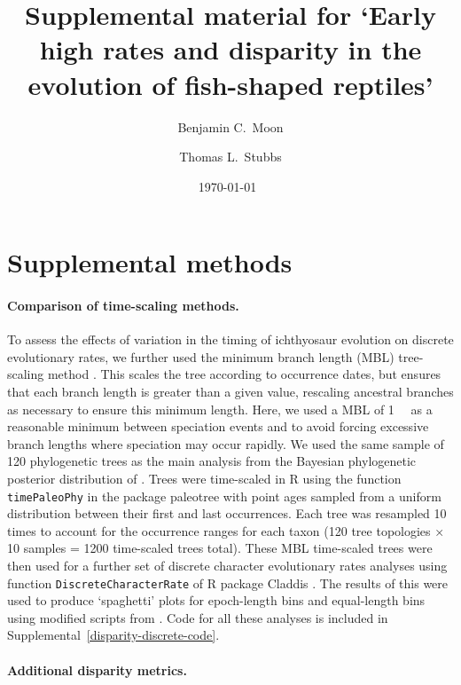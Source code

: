 \documentclass[british,a4paper]{article}
\title{Supplemental material for ‘Early high rates and disparity in the evolution of fish-shaped reptiles’}
\author{Benjamin C.\ Moon \and Thomas L.\ Stubbs}
\date{\today~\version}
\begin{document}
\maketitle

\tableofcontents

\section{Supplemental methods}\label{supplemental-methods}

\paragraph{Comparison of time-scaling methods.}
\label{comparison-of-time-scaling-methods}

To assess the effects of variation in the timing of ichthyosaur evolution on discrete evolutionary rates, we further used the minimum branch length (MBL) tree-scaling method \autocite{Bapst2012, Laurin2004SystBiol}. This scales the tree according to occurrence dates, but ensures that each branch length is greater than a given value, rescaling ancestral branches as necessary to ensure this minimum length. Here, we used a MBL of \SI{1}{\mega\annum} as a reasonable minimum between speciation events and to avoid forcing excessive branch lengths where speciation may occur rapidly. We used the same sample of 120 phylogenetic trees as the main analysis from the Bayesian phylogenetic posterior distribution of \textcite{Moon2019a}. Trees were time-scaled in R \autocite{R} using the function \texttt{timePaleoPhy} in the package paleotree \autocite{Bapst2012} with point ages sampled from a uniform distribution between their first and last occurrences. Each tree was resampled 10 times to account for the occurrence ranges for each taxon (120 tree topologies × 10 samples = 1200 time-scaled trees total). These MBL time-scaled trees were then used for a further set of discrete character evolutionary rates analyses using function \texttt{DiscreteCharacterRate} of R package Claddis \autocite{Lloyd2016}. The results of this were used to produce `spaghetti' plots for epoch-length bins and equal-length bins using modified scripts from \textcite{Close2015a}. Code for all these analyses is included in Supplemental~\ref{disparity-discrete-code}.

\paragraph{Additional disparity metrics.}
\end{document}
